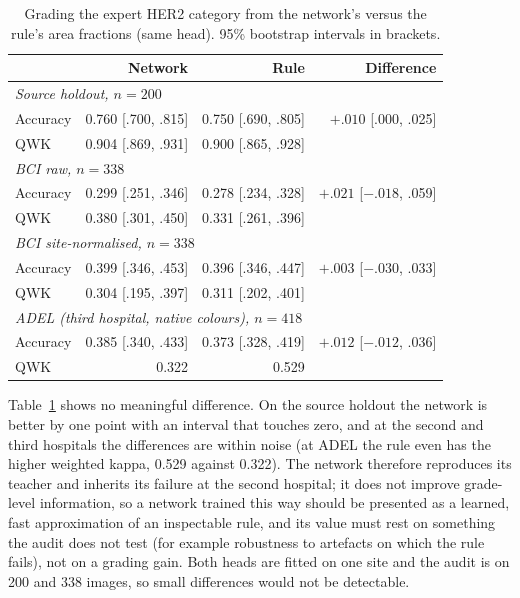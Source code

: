 \documentclass[conference]{IEEEtran}
\begin{document}
\begin{table}[t]
\centering
\caption{Grading the expert HER2 category from the network's versus the rule's area fractions (same head). 95\% bootstrap intervals in brackets.}
\label{tab:audit}
\footnotesize\setlength{\tabcolsep}{3pt}
\begin{tabular}{lrrr}
\toprule
 & Network & Rule & Difference\\
\midrule
\multicolumn{4}{l}{\textit{Source holdout, $n=200$}}\\
Accuracy & 0.760 [.700, .815] & 0.750 [.690, .805] & $+.010$ [.000, .025]\\
QWK & 0.904 [.869, .931] & 0.900 [.865, .928] & \\
\multicolumn{4}{l}{\textit{BCI raw, $n=338$}}\\
Accuracy & 0.299 [.251, .346] & 0.278 [.234, .328] & $+.021$ [$-.018$, .059]\\
QWK & 0.380 [.301, .450] & 0.331 [.261, .396] & \\
\multicolumn{4}{l}{\textit{BCI site-normalised, $n=338$}}\\
Accuracy & 0.399 [.346, .453] & 0.396 [.346, .447] & $+.003$ [$-.030$, .033]\\
QWK & 0.304 [.195, .397] & 0.311 [.202, .401] & \\
\multicolumn{4}{l}{\textit{ADEL (third hospital, native colours), $n=418$}}\\
Accuracy & 0.385 [.340, .433] & 0.373 [.328, .419] & $+.012$ [$-.012$, .036]\\
QWK & 0.322 & 0.529 & \\
\bottomrule
\end{tabular}
\end{table}

Table~\ref{tab:audit} shows no meaningful difference. On the source holdout the network is better by one point with an interval that touches
zero, and at the second and third hospitals the differences are within noise (at ADEL the rule even has the higher weighted kappa, 0.529 against 0.322). The network therefore reproduces its teacher and inherits its
failure at the second hospital; it does not improve grade-level information, so a network trained this way should be presented as a learned,
fast approximation of an inspectable rule, and its value must rest on something the audit does not test (for example robustness to artefacts on
which the rule fails), not on a grading gain. Both heads are fitted on one site and the audit is on 200 and 338 images, so small differences
would not be detectable.
\end{document}
